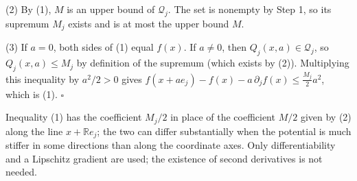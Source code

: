 \documentclass[11pt,a4paper]{report}
\begin{document}
(2) By (1), \(M\) is an upper bound of \(\mathcal Q_j\). The set is nonempty by Step 1, so its supremum \(M_j\) exists and is at most the upper bound \(M\).




(3) If \(a=0\), both sides of (1) equal \(f(x)\). If \(a\ne0\), then \(Q_j(x,a)\in\mathcal Q_j\), so \(Q_j(x,a)\le M_j\) by definition of the supremum (which exists by (2)). Multiplying this inequality by \(a^2/2>0\) gives \(f(x+ae_j)-f(x)-a\,\partial_jf(x)\le\frac{M_j}2a^2\), which is (1). \(\square\)




Inequality (1) has the coefficient \(M_j/2\) in place of the coefficient \(M/2\) given by (2) along the line \(x+\mathbb Re_j\); the two can differ substantially when the potential is much stiffer in some directions than along the coordinate axes. Only differentiability and a Lipschitz gradient are used; the existence of second derivatives is not needed.
\end{document}
